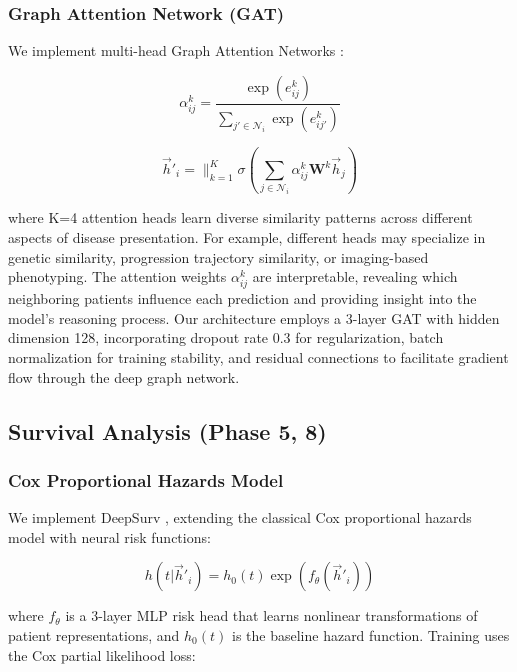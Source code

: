 \documentclass[conference]{IEEEtran}
\begin{document}
\subsubsection{Graph Attention Network (GAT)}
We implement multi-head Graph Attention Networks \cite{velickovic2018graph}:

\begin{equation}
\alpha_{ij}^k = \frac{\exp(e_{ij}^k)}{\sum_{j' \in \mathcal{N}_i} \exp(e_{ij'}^k)}
\end{equation}

\begin{equation}
\vec{h}'_i = \|_{k=1}^K \sigma\left(\sum_{j \in \mathcal{N}_i} \alpha_{ij}^k \mathbf{W}^k\vec{h}_j\right)
\end{equation}

where K=4 attention heads learn diverse similarity patterns across different aspects of disease presentation. For example, different heads may specialize in genetic similarity, progression trajectory similarity, or imaging-based phenotyping. The attention weights $\alpha_{ij}^k$ are interpretable, revealing which neighboring patients influence each prediction and providing insight into the model's reasoning process. Our architecture employs a 3-layer GAT with hidden dimension 128, incorporating dropout rate 0.3 for regularization, batch normalization for training stability, and residual connections to facilitate gradient flow through the deep graph network.

\subsection{Survival Analysis (Phase 5, 8)}

\subsubsection{Cox Proportional Hazards Model}
We implement DeepSurv \cite{katzman2018deepsurv}, extending the classical Cox proportional hazards model with neural risk functions:

\begin{equation}
h(t|\vec{h}'_i) = h_0(t) \exp(f_\theta(\vec{h}'_i))
\end{equation}

where $f_\theta$ is a 3-layer MLP risk head that learns nonlinear transformations of patient representations, and $h_0(t)$ is the baseline hazard function. Training uses the Cox partial likelihood loss:
\end{document}
